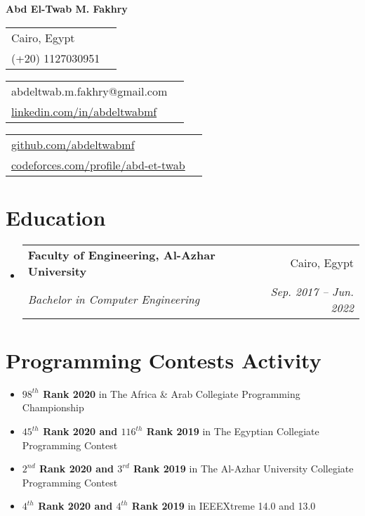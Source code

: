 \documentclass[letterpaper, 11pt]{article}
\makeatletter
\newcommand{\Item}[2]{\item\small{\textbf{#1}{#2 \vspace{-2pt}}}}
\newcommand{\SubItem}[2]{\Item{#1}{#2}\vspace{-4pt}}
\newcommand{\SubSecListBeg}{\begin{itemize}[leftmargin=*]}
\newcommand{\SubSecListEnd}{\end{itemize}}
\newcommand{\SubSecEducation}[4] {
	\vspace{-1pt}\item
	\begin{tabular*}{0.97\textwidth}[t]{l@{\extracolsep{\fill}}r}
		\textbf{#1} & #2 \\
		\textit{\small#3} & \textit{\small #4} \\
	\end{tabular*}\vspace{-5pt}
}
\newcommand{\LinksTable}[4] {
	\begin{tabular}{lr}
	#1 #2 \\
	#3 #4 \\
	\end{tabular}
}
\makeatother
\begin{document}
\textbf{\Huge Abd El-Twab M. Fakhry} \\

\begin{minipage}[t]{0.10\textwidth}
	\LinksTable
	{\faIcon{location-arrow}} {Cairo, Egypt}
	{\faIcon{mobile-alt}}     {(+20) 1127030951}
\end{minipage}
\hfill
\begin{minipage}[t]{0.20\textwidth}
	\LinksTable
	{\faIcon{envelope}} {abdeltwab.m.fakhry@gmail.com}
	{\faIcon{linkedin}} {\href{https://www.linkedin.com/in/abdeltwabmf/}{linkedin.com/in/abdeltwabmf}}
\end{minipage}
\hfill
\begin{minipage}[t]{0.35\textwidth}
	\LinksTable
	{\faIcon{github}} {\href{https://github.com/AbdeltwabMF}{github.com/abdeltwabmf}}
	{\faIcon{code}}   {\href{https://codeforces.com/profile/Abd-Et-Twab}{codeforces.com/profile/abd-et-twab}}
\end{minipage}


\section{Education}
\SubSecListBeg
	\SubSecEducation
	{\faIcon{university} Faculty of Engineering, Al-Azhar University} {Cairo, Egypt}
	{Bachelor in Computer Engineering}                                {Sep. 2017 -- Jun. 2022}
\SubSecListEnd


\section{Programming Contests Activity}
\SubSecListBeg
	\SubItem
	{$98^{th}$ Rank 2020 }
	{in The Africa \& Arab Collegiate Programming Championship}
	\SubItem
	{$45^{th}$ Rank 2020 and $116^{th}$ Rank 2019 }
	{in The Egyptian Collegiate Programming Contest}
	\SubItem
	{$2^{nd}$  Rank 2020 and $3^{rd}$   Rank 2019 }
	{in The Al-Azhar University Collegiate Programming Contest}
    	\SubItem
      	{$4^{th}$  Rank 2020 and $4^{th}$   Rank 2019 }
	{in IEEEXtreme 14.0 and 13.0}
\SubSecListEnd


\end{document}
